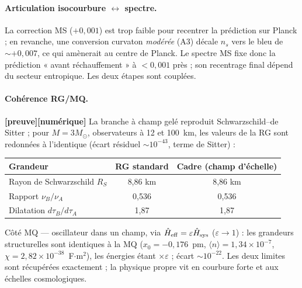 \documentclass[11pt,a4paper]{article}
\newcommand{\st}[1]{\textbf{\textcolor{blue!45!black}{[#1]}}}
\begin{document}
\paragraph{Articulation isocourbure $\leftrightarrow$ spectre.} La correction MS ($+0{,}001$) est trop faible pour recentrer la prédiction sur Planck ; en revanche, une conversion curvaton \emph{modérée} (A3) décale $n_s$ vers le bleu de $\sim+0{,}007$, ce qui amènerait au centre de Planck. Le spectre MS fixe donc la prédiction « avant réchauffement » à $<0{,}001$ près ; son recentrage final dépend du secteur entropique. Les deux étapes sont couplées.

\paragraph{Cohérence RG/MQ.}
\st{preuve}\st{numérique} La branche à champ gelé reproduit Schwarzschild–de Sitter ; pour $M=3M_\odot$, observateurs à 12 et 100~km, les valeurs de la RG sont redonnées à l'identique (écart résiduel $\sim10^{-43}$, terme de Sitter) :
\begin{center}\small
\begin{tabular}{lcc}
\toprule
Grandeur & RG standard & Cadre (champ d'échelle) \\
\midrule
Rayon de Schwarzschild $R_S$ & 8,86 km & 8,86 km \\
Rapport $\nu_B/\nu_A$ & 0,536 & 0,536 \\
Dilatation $d\tau_B/d\tau_A$ & 1,87 & 1,87 \\
\bottomrule
\end{tabular}
\end{center}
Côté MQ — oscillateur dans un champ, via $\hat H_{\rm eff}=\varepsilon\hat H_{\rm sys}$ ($\varepsilon\to1$) : les grandeurs structurelles sont identiques à la MQ ($x_0=-0{,}176$~pm, $\langle n\rangle=1{,}34\times10^{-7}$, $\chi=2{,}82\times10^{-38}$~F$\cdot$m$^2$), les énergies étant $\times\varepsilon$ ; écart $\sim10^{-22}$. Les deux limites sont récupérées exactement ; la physique propre vit en courbure forte et aux échelles cosmologiques.
\end{document}
